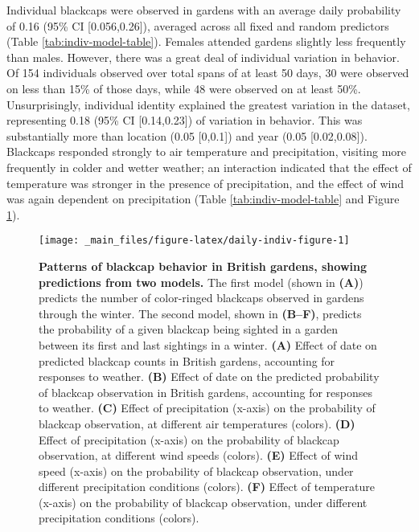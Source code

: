 \documentclass[a4paper, nobind]{templates/ociamthesis}
\begin{document}
Individual blackcaps were observed in gardens with an average daily probability of 0.16 (95\% CI {[}0.056,0.26{]}), averaged across all fixed and random predictors (Table \ref{tab:indiv-model-table}). Females attended gardens slightly less frequently than males. However, there was a great deal of individual variation in behavior. Of 154 individuals observed over total spans of at least 50 days, 30 were observed on less than 15\% of those days, while 48 were observed on at least 50\%. Unsurprisingly, individual identity explained the greatest variation in the dataset, representing 0.18 (95\% CI {[}0.14,0.23{]}) of variation in behavior. This was substantially more than location (0.05 {[}0,0.1{]}) and year (0.05 {[}0.02,0.08{]}). Blackcaps responded strongly to air temperature and precipitation, visiting more frequently in colder and wetter weather; an interaction indicated that the effect of temperature was stronger in the presence of precipitation, and the effect of wind was again dependent on precipitation (Table \ref{tab:indiv-model-table} and Figure \ref{fig:daily-indiv-figure}).



\begin{figure}
\texttt{[image: \_main\_files/figure-latex/daily-indiv-figure-1]} \caption{\textbf{Patterns of blackcap behavior in British gardens, showing predictions from two models.} The first model (shown in \textbf{(A)}) predicts the number of color-ringed blackcaps observed in gardens through the winter. The second model, shown in \textbf{(B--F)}, predicts the probability of a given blackcap being sighted in a garden between its first and last sightings in a winter. \textbf{(A)} Effect of date on predicted blackcap counts in British gardens, accounting for responses to weather. \textbf{(B)} Effect of date on the predicted probability of blackcap observation in British gardens, accounting for responses to weather. \textbf{(C)} Effect of precipitation (x-axis) on the probability of blackcap observation, at different air temperatures (colors). \textbf{(D)} Effect of precipitation (x-axis) on the probability of blackcap observation, at different wind speeds (colors). \textbf{(E)} Effect of wind speed (x-axis) on the probability of blackcap observation, under different precipitation conditions (colors). \textbf{(F)} Effect of temperature (x-axis) on the probability of blackcap observation, under different precipitation conditions (colors).}\label{fig:daily-indiv-figure}
\end{figure}
\end{document}
